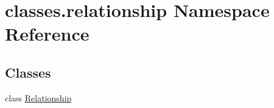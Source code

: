 \hypertarget{namespaceclasses_1_1relationship}{}\section{classes.\+relationship Namespace Reference}
\label{namespaceclasses_1_1relationship}
\subsection*{Classes}
\begin{DoxyCompactItemize}
\item 
class \hyperlink{classclasses_1_1relationship_1_1Relationship}{Relationship}
\end{DoxyCompactItemize}
